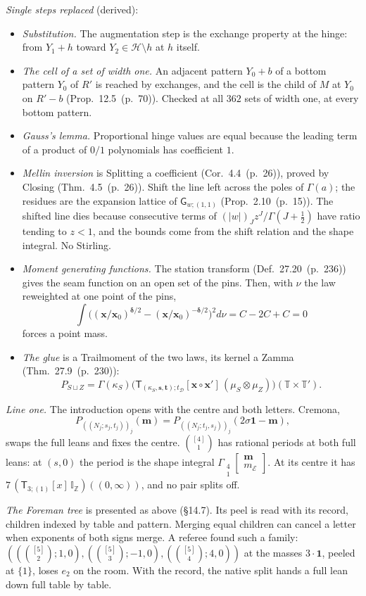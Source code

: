 \documentclass[11pt]{article}
\newcommand{\cE}{\mathcal E}
\newcommand{\one}{\mathbf 1}
\newcommand{\sG}{\mathsf G}
\newcommand{\sT}{\mathsf T}
\newcommand{\Gst}[4]{\Gamma_{\substack{#1\\#2}}\!\begin{bmatrix}#3\\#4\end{bmatrix}}
\newcommand{\IZ}{\mathbb I_{\mathbb Z}}
\newcommand{\Tx}[3]{(\sT_{#1;(1)}[x]\,#2)((#3,\infty))}
\newcommand{\hb}[2]{#1~(p.~#2)}   %
\theoremstyle{plain}
\theoremstyle{remark}
\begin{document}
\emph{Single steps replaced} (derived):
\begin{itemize}
\item \emph{Substitution.} The augmentation step is the exchange property at the hinge: from $Y_1+h$ toward $Y_2\in\mathcal H\setminus h$ at $h$ itself.
\item \emph{The cell of a set of width one.} An adjacent pattern $Y_0+b$ of a bottom pattern $Y_0$ of $R'$ is reached by exchanges, and the cell is the child of $M$ at $Y_0$ on $R'-b$ (Prop.~\hb{12.5}{70}). Checked at all $362$ sets of width one, at every bottom pattern.
\item \emph{Gauss's lemma.} Proportional hinge values are equal because the leading term of a product of $0/1$ polynomials has coefficient $1$.
\item \emph{Mellin inversion} is Splitting a coefficient (Cor.~\hb{4.4}{26}), proved by Closing (Thm.~\hb{4.5}{26}). Shift the line left across the poles of $\Gamma(a)$; the residues are the expansion lattice of $\sG_{w;(1,1)}$ (Prop.~\hb{2.10}{15}). The shifted line dies because consecutive terms of $(|w|)_Jz^J/\Gamma(J+\frac12)$ have ratio tending to $z<1$, and the bounds come from the shift relation and the shape integral. No Stirling.
\item \emph{Moment generating functions.} The station transform (Def.~\hb{27.20}{236}) gives the seam function on an open set of the pins. Then, with $\nu$ the law reweighted at one point of the pins,
\[
\int\Big((\mathbf x/\mathbf x_0)^{\boldsymbol\delta/2}-(\mathbf x/\mathbf x_0)^{-\boldsymbol\delta/2}\Big)^2d\nu=C-2C+C=0
\]
forces a point mass.
\item \emph{The glue} is a Trailmoment of the two laws, its kernel a Zamma (Thm.~\hb{27.9}{230}):
\[
P_{S\sqcup Z}=\Gamma(\kappa_S)\big(\sT_{(\kappa_S,\mathbf s,\mathbf t);t_{\mathcal D}}[\mathbf x\circ\mathbf x']\,(\mu_S\otimes\mu_Z)\big)(\mathbb T\times\mathbb T').
\]
\end{itemize}

\emph{Line one.} The introduction opens with the centre and both letters. Cremona,
\[
P_{((N_j;s_j,t_j))_j}(\mathbf m)=P_{((N_j;t_j,s_j))_j}(2\sigma\one-\mathbf m),
\]
swaps the full leans and fixes the centre. $\binom{[4]}1$ has rational periods at both full leans: at $(s,0)$ the period is the shape integral $\Gst41{\mathbf m}{m_{\cE}}$. At its centre it has $7\,\Tx3{\IZ}0$, and no pair splits off.

\emph{The Foreman tree} is presented as above (\S14.7). Its peel is read with its record, children indexed by table and pattern. Merging equal children can cancel a letter when exponents of both signs merge. A referee found such a family: $((\binom{[5]}2;1,0),(\binom{[5]}3;-1,0),(\binom{[5]}4;4,0))$ at the masses $3\cdot\one$, peeled at $\{1\}$, loses $e_2$ on the room. With the record, the native split hands a full lean down full table by table.
\end{document}
